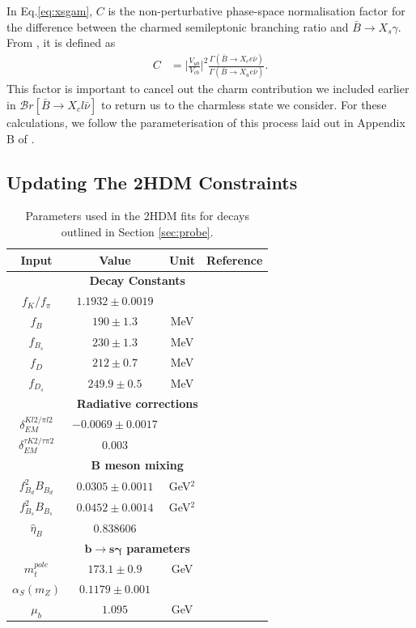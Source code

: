 \documentclass[a4paper,12pt]{article}
\begin{document}
In Eq.\eqref{eq:xsgam}, $C$ is the non-perturbative phase-space normalisation factor for the difference between the charmed semileptonic branching ratio and $\bar{B}\to X_s\gamma$. 
From \cite{bmes}, it is defined as 
\begin{align}
    \label{eq:phasespace}
    C &= \bigg|\frac{V_{ub}}{V_{cb}}\bigg|^2\frac{\Gamma(\bar{B}\to X_ce\bar{\nu})}{\Gamma(\bar{B}\to X_ue\bar{\nu})}.
\end{align}
This factor is important to cancel out the charm contribution we included earlier in $\mathcal{B}r[\bar{B}\to X_cl\bar{\nu}]$ to return us to the charmless state we consider.
For these calculations, we follow the parameterisation of this process laid out in Appendix B of \cite{desc}.

\subsection{Updating The 2HDM Constraints}
\label{subsec:fit}
\begin{table}
    \centering
    \begin{tabular}{c|ccc}
        \hline\hline
        Input & Value & Unit & Reference \\
        \hline\hline
        \multicolumn{4}{c}{\bfseries Decay Constants} \\
        \hline\hline
        $f_K/f_\pi$ & $1.1932\pm0.0019$ & & \cite{pdg}\\
        $f_B$ & $190\pm1.3$ & MeV & \cite{flag} \\
        $f_{B_s}$ & $230\pm1.3$ & MeV & \cite{flag} \\
        $f_D$ & $212\pm0.7$ & MeV & \cite{flag} \\
        $f_{D_s}$ & $249.9\pm0.5$ & MeV & \cite{flag} \\
        \hline\hline
        \multicolumn{4}{c}{\bfseries Radiative corrections} \\
        \hline\hline
        $\delta^{Kl2/\pi l2}_{EM}$ & $-0.0069\pm0.0017$ & & \cite{pdg} \\
        $\delta^{\tau K2/\tau\pi 2}_{EM}$ & $0.003$ & & \cite{desc} \\
        \hline\hline
        \multicolumn{4}{c}{\bfseries B meson mixing} \\
        \hline\hline
        $f^2_{B_d}B_{B_d}$ & $0.0305\pm0.0011$ & GeV$^2$ & \cite{bmix} \\
        $f^2_{B_s}B_{B_s}$ & $0.0452\pm0.0014$ & GeV$^2$ & \cite{bmix} \\
        $\hat{\eta}_B$ & $0.838606$ & & \cite{alex} \\
        \hline\hline
        \multicolumn{4}{c}{\bfseries $\mathbf{b\to s\gamma}$ parameters} \\
        \hline\hline
        $m_t^{pole}$ & $173.1\pm0.9$ & GeV & \cite{pdg} \\
        $\alpha_S(m_Z)$ & $0.1179\pm0.001$ & & \cite{pdg} \\
        $\mu_b$ & $1.095$ & GeV & \\
        \hline\hline
    \end{tabular}
    \caption{\label{tab:params} Parameters used in the 2HDM fits for decays outlined in Section \ref{sec:probe}.}
\end{table}
\end{document}

